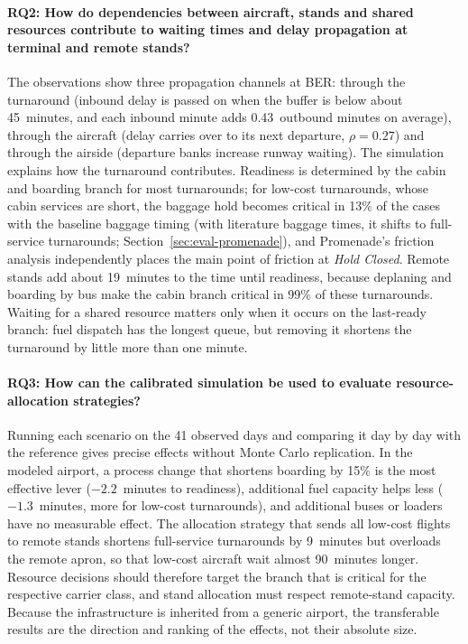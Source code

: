 \paragraph{RQ2: How do dependencies between aircraft, stands and shared resources contribute to waiting times and delay propagation at terminal and remote stands?}
The observations show three propagation channels at BER: through the turnaround (inbound delay is passed on when the buffer is below about 45~minutes, and each inbound minute adds 0.43~outbound minutes on average), through the aircraft (delay carries over to its next departure, $\rho=0.27$) and through the airside (departure banks increase runway waiting). The simulation explains how the turnaround contributes. Readiness is determined by the cabin and boarding branch for most turnarounds; for low-cost turnarounds, whose cabin services are short, the baggage hold becomes critical in 13\% of the cases with the baseline baggage timing (with literature baggage times, it shifts to full-service turnarounds; Section~\ref{sec:eval-promenade}), and Promenade's friction analysis independently places the main point of friction at \emph{Hold Closed}. Remote stands add about 19~minutes to the time until readiness, because deplaning and boarding by bus make the cabin branch critical in 99\% of these turnarounds. Waiting for a shared resource matters only when it occurs on the last-ready branch: fuel dispatch has the longest queue, but removing it shortens the turnaround by little more than one minute.

\paragraph{RQ3: How can the calibrated simulation be used to evaluate resource-allocation strategies?}
Running each scenario on the 41 observed days and comparing it day by day with the reference gives precise effects without Monte Carlo replication. In the modeled airport, a process change that shortens boarding by 15\% is the most effective lever ($-2.2$~minutes to readiness), additional fuel capacity helps less ($-1.3$~minutes, more for low-cost turnarounds), and additional buses or loaders have no measurable effect. The allocation strategy that sends all low-cost flights to remote stands shortens full-service turnarounds by 9~minutes but overloads the remote apron, so that low-cost aircraft wait almost 90~minutes longer. Resource decisions should therefore target the branch that is critical for the respective carrier class, and stand allocation must respect remote-stand capacity. Because the infrastructure is inherited from a generic airport, the transferable results are the direction and ranking of the effects, not their absolute size.

